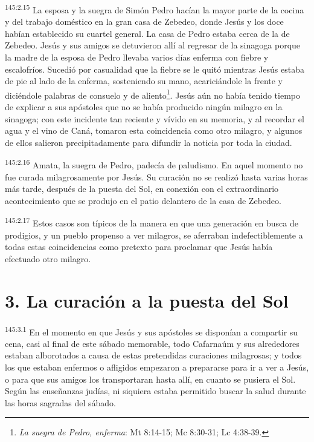 \par
\textsuperscript{145:2.15} La esposa y la suegra de Simón Pedro hacían la mayor parte de la cocina y del trabajo doméstico en la gran casa de Zebedeo, donde Jesús y los doce habían establecido su cuartel general. La casa de Pedro estaba cerca de la de Zebedeo. Jesús y sus amigos se detuvieron allí al regresar de la sinagoga porque la madre de la esposa de Pedro llevaba varios días enferma con fiebre y escalofríos. Sucedió por casualidad que la fiebre se le quitó mientras Jesús estaba de pie al lado de la enferma, sosteniendo su mano, acariciándole la frente y diciéndole palabras de consuelo y de aliento\footnote{\textit{La suegra de Pedro, enferma}: Mt 8:14-15; Mc 8:30-31; Lc 4:38-39.}. Jesús aún no había tenido tiempo de explicar a sus apóstoles que no se había producido ningún milagro en la sinagoga; con este incidente tan reciente y vívido en su memoria, y al recordar el agua y el vino de Caná, tomaron esta coincidencia como otro milagro, y algunos de ellos salieron precipitadamente para difundir la noticia por toda la ciudad.

\par
\textsuperscript{145:2.16} Amata, la suegra de Pedro, padecía de paludismo. En aquel momento no fue curada milagrosamente por Jesús. Su curación no se realizó hasta varias horas más tarde, después de la puesta del Sol, en conexión con el extraordinario acontecimiento que se produjo en el patio delantero de la casa de Zebedeo.

\par
\textsuperscript{145:2.17} Estos casos son típicos de la manera en que una generación en busca de prodigios, y un pueblo propenso a ver milagros, se aferraban indefectiblemente a todas estas coincidencias como pretexto para proclamar que Jesús había efectuado otro milagro.

\section*{3. La curación a la puesta del Sol}
\par
\textsuperscript{145:3.1} En el momento en que Jesús y sus apóstoles se disponían a compartir su cena, casi al final de este sábado memorable, todo Cafarnaúm y sus alrededores estaban alborotados a causa de estas pretendidas curaciones milagrosas; y todos los que estaban enfermos o afligidos empezaron a prepararse para ir a ver a Jesús, o para que sus amigos los transportaran hasta allí, en cuanto se pusiera el Sol. Según las enseñanzas judías, ni siquiera estaba permitido buscar la salud durante las horas sagradas del sábado.

